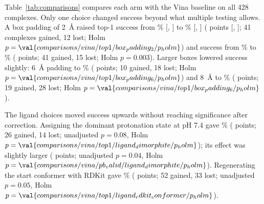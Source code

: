 Table~\ref{tab:comparisons} compares each arm with the Vina baseline on all 428 complexes.
Only one choice changed success beyond what multiple testing allows. A box padding of
\SI{2}{\angstrom} raised top-1 success from \% [, ] to \% [, ]
( points [, ]; 41 complexes gained, 12 lost; Holm $p = \val{comparisons/vina/top1/box_padding_2/p_holm}$) and \pbvalid{}
success from \% to \% ( points; 41 gained, 15 lost; Holm $p = 0.003$). Larger
boxes lowered success slightly: \SI{6}{\angstrom} padding to \% ( points; 10
gained, 18 lost; Holm $p = \val{comparisons/vina/top1/box_padding_6/p_holm}$) and \SI{8}{\angstrom} to \% ( points; 19
gained, 28 lost; Holm $p = \val{comparisons/vina/top1/box_padding_6/p_holm}$).

The ligand choices moved success upwards without reaching significance after correction.
Assigning the dominant protonation state at pH 7.4 gave \% ( points; 26 gained, 14
lost; unadjusted $p = 0.08$, Holm $p = \val{comparisons/vina/top1/ligand_dimorphite/p_holm}$); its \pbvalid{} effect was slightly larger
( points; unadjusted $p = 0.04$, Holm $p = \val{comparisons/vina/pb_valid/ligand_dimorphite/p_holm}$). Regenerating the start conformer with
RDKit gave \% ( points; 52 gained, 33 lost; unadjusted $p = 0.05$, Holm
$p = \val{comparisons/vina/top1/ligand_rdkit_conformer/p_holm}$).

